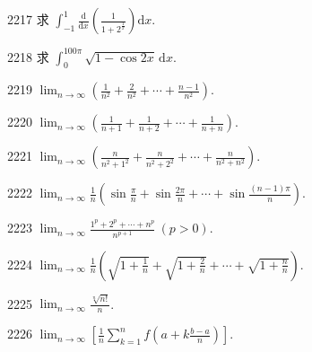 \begin{prob}[S]{2217}
求 $\displaystyle\int_{-1}^{1} \frac{\mathrm{d}}{\mathrm{d}x}\left(\frac{1}{1 + 2^{\frac{1}{x}}}\right)\mathrm{d}x$.
\end{prob}

\begin{prob}[S]{2218}
求 $\displaystyle\int_{0}^{100\pi} \sqrt{1 - \cos 2x}\,\mathrm{d}x$.
\end{prob}


\begin{prob}[S]{2219}
$\displaystyle\lim_{n \to \infty} \left(\frac{1}{n^2} + \frac{2}{n^2} + \cdots + \frac{n-1}{n^2}\right)$.
\end{prob}

\begin{prob}[S]{2220}
$\displaystyle\lim_{n \to \infty} \left(\frac{1}{n+1} + \frac{1}{n+2} + \cdots + \frac{1}{n+n}\right)$.
\end{prob}

\begin{prob}[S]{2221}
$\displaystyle\lim_{n \to \infty} \left(\frac{n}{n^2 + 1^2} + \frac{n}{n^2 + 2^2} + \cdots + \frac{n}{n^2 + n^2}\right)$.
\end{prob}

\begin{prob}[S]{2222}
$\displaystyle\lim_{n \to \infty} \frac{1}{n}\left(\sin\frac{\pi}{n} + \sin\frac{2\pi}{n} + \cdots + \sin\frac{(n-1)\pi}{n}\right)$.
\end{prob}

\begin{prob}[S]{2223}
$\displaystyle\lim_{n \to \infty} \frac{1^p + 2^p + \cdots + n^p}{n^{p+1}} \ (p > 0)$.
\end{prob}

\begin{prob}[S]{2224}
$\displaystyle\lim_{n \to \infty} \frac{1}{n}\left(\sqrt{1 + \frac{1}{n}} + \sqrt{1 + \frac{2}{n}} + \cdots + \sqrt{1 + \frac{n}{n}}\right)$.
\end{prob}

\begin{prob}[S]{2225}
$\displaystyle\lim_{n \to \infty} \frac{\sqrt[n]{n!}}{n}$.
\end{prob}

\begin{prob}[S]{2226}
$\displaystyle\lim_{n \to \infty} \left[\frac{1}{n} \sum_{k=1}^{n} f\left(a + k\frac{b - a}{n}\right)\right]$.
\end{prob}

